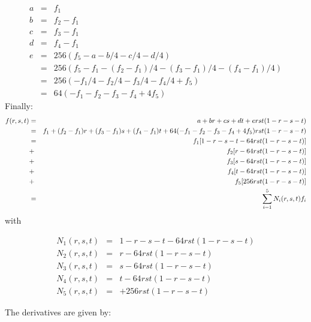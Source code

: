 \begin{eqnarray}
a&=&f_1\\
b&=&f_2-f_1\\
c&=&f_3-f_1\\
d&=&f_4-f_1\\
e&=&256(f_5-a-b/4-c/4-d/4) \\
&=&256(f_5-f_1-(f_2-f_1)/4-(f_3-f_1)/4-(f_4-f_1)/4) \\
&=&256(-f_1/4 - f_2/4 - f_3/4 - f_4/4 + f_5  ) \\
&=&64(-f_1 - f_2 - f_3 - f_4 + 4f_5  )
\end{eqnarray}
Finally:
\begin{eqnarray}
f(r,s,t)
&=& a+br+cs+dt+erst(1-r-s-t) \nonumber\\
&=& f_1 + (f_2-f_1)r + (f_3-f_1)s + (f_4-f_1)t+ 64(-f_1 - f_2 - f_3 - f_4 + 4f_5  ) rst(1-r-s-t)  \nonumber\\
&=& f_1 [1-r-s-t - 64rst(1-r-s-t)]\nonumber\\
&+& f_2 [r- 64rst(1-r-s-t)]\nonumber\\
&+& f_3 [s- 64rst(1-r-s-t)]\nonumber\\
&+& f_4 [t- 64rst(1-r-s-t)]\nonumber\\
&+& f_5 [256 rst(1-r-s-t)] \nonumber\\
&=&\sum_{i=1}^5 N_i(r,s,t) f_i
\end{eqnarray}
with
\begin{mdframed}[backgroundcolor=blue!5]
\begin{eqnarray}
N_1(r,s,t) &=& 1-r-s-t - 64rst(1-r-s-t) \\
N_2(r,s,t) &=& r - 64rst(1-r-s-t) \\
N_3(r,s,t) &=& s - 64rst(1-r-s-t) \\
N_4(r,s,t) &=& t - 64rst(1-r-s-t) \\
N_5(r,s,t) &=&  + 256rst(1-r-s-t) 
\end{eqnarray}
\end{mdframed}



The derivatives are given by:

